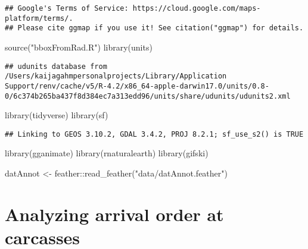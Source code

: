 \documentclass[
]{article}
\newenvironment{Shaded}{\begin{snugshade}}{\end{snugshade}}
\newcommand{\FunctionTok}[1]{\textcolor[rgb]{0.00,0.00,0.00}{#1}}
\newcommand{\NormalTok}[1]{#1}
\newcommand{\OtherTok}[1]{\textcolor[rgb]{0.56,0.35,0.01}{#1}}
\newcommand{\SpecialCharTok}[1]{\textcolor[rgb]{0.00,0.00,0.00}{#1}}
\newcommand{\StringTok}[1]{\textcolor[rgb]{0.31,0.60,0.02}{#1}}
\begin{document}
\begin{verbatim}
## Google's Terms of Service: https://cloud.google.com/maps-platform/terms/.
## Please cite ggmap if you use it! See citation("ggmap") for details.
\end{verbatim}

\begin{Shaded}
\begin{Highlighting}[]
\FunctionTok{source}\NormalTok{(}\StringTok{"bboxFromRad.R"}\NormalTok{)}
\FunctionTok{library}\NormalTok{(units)}
\end{Highlighting}
\end{Shaded}

\begin{verbatim}
## udunits database from /Users/kaijagahmpersonalprojects/Library/Application Support/renv/cache/v5/R-4.2/x86_64-apple-darwin17.0/units/0.8-0/6c374b265ba437f8d384ec7a313edd96/units/share/udunits/udunits2.xml
\end{verbatim}

\begin{Shaded}
\begin{Highlighting}[]
\FunctionTok{library}\NormalTok{(tidyverse)}
\FunctionTok{library}\NormalTok{(sf)}
\end{Highlighting}
\end{Shaded}

\begin{verbatim}
## Linking to GEOS 3.10.2, GDAL 3.4.2, PROJ 8.2.1; sf_use_s2() is TRUE
\end{verbatim}

\begin{Shaded}
\begin{Highlighting}[]
\FunctionTok{library}\NormalTok{(gganimate)}
\FunctionTok{library}\NormalTok{(rnaturalearth)}
\FunctionTok{library}\NormalTok{(gifski)}
\end{Highlighting}
\end{Shaded}

\begin{Shaded}
\begin{Highlighting}[]
\NormalTok{datAnnot }\OtherTok{\textless{}{-}}\NormalTok{ feather}\SpecialCharTok{::}\FunctionTok{read\_feather}\NormalTok{(}\StringTok{"data/datAnnot.feather"}\NormalTok{)}
\end{Highlighting}
\end{Shaded}

\hypertarget{analyzing-arrival-order-at-carcasses}{%
\section{Analyzing arrival order at
carcasses}\label{analyzing-arrival-order-at-carcasses}}
\end{document}

